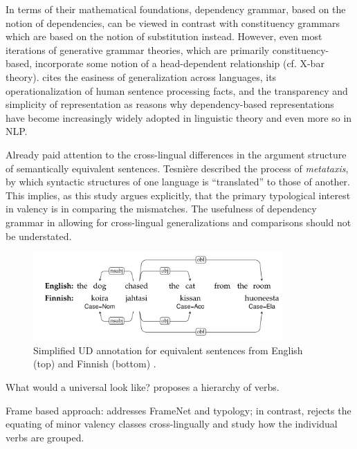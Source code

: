 In terms of their mathematical foundations, dependency grammar, based on the notion of dependencies, can be viewed in contrast with constituency grammars which are based on the notion of substitution instead\citep{stabler2019}. However, even most iterations of generative grammar theories, which are primarily constituency-based, incorporate some notion of a head-dependent relationship (cf. X-bar theory). \citet{demarneffe2019} cites the easiness of generalization across languages, its operationalization of human sentence processing facts, and the transparency and simplicity of representation as reasons why dependency-based representations have become increasingly widely adopted in linguistic theory and even more so in NLP.

Already \citet{tesniere1959} paid attention to the cross-lingual differences in the argument structure of semantically equivalent sentences. Tesnière described the process of \textit{metataxis}, by which syntactic structures of one language is ``translated'' to those of another. This implies, as this study argues explicitly, that the primary typological interest in valency is in comparing the mismatches. The usefulness of dependency grammar in allowing for cross-lingual generalizations and comparisons should not be understated. 


\begin{figure}
    \includegraphics[width=0.85\textwidth]{figures/ud_example_sentence.png}
    \centering
    \caption{Simplified UD annotation for equivalent sentences from English (top) and Finnish (bottom) \citep{demarneffe2021}.}\label{fig:ud-example-sentence}
\end{figure}
 


What would a universal look like? \citet{tsunoda1981, tsunoda1985, tsunoda2015} proposes a hierarchy of verbs.

Frame based approach: \citet{baker2020, ellsworth2021} addresses FrameNet and typology; in contrast, \citet{say2014} rejects the equating of minor valency classes cross-lingually and study how the individual verbs are grouped.

